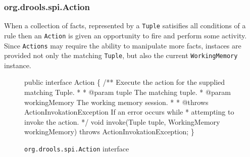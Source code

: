 \subsubsection{org.drools.spi.Action}

When a collection of facts, represented by a \verb|Tuple| satisifies
all conditions of a rule then an \verb|Action| is given an opportunity
to fire and perform some activity.  Since \verb|Actions| may require
the ability to manipulate more facts, instaces are provided not only
the matching \verb|Tuple|, but also the current \verb|WorkingMemory|
instance.

\begin{figure}
\begin{codelisting}
public interface Action
\{
    /** Execute the action for the supplied matching Tuple.
     *
     *  @param tuple The matching tuple.
     *  @param workingMemory The working memory session.
     *
     *  @throws ActionInvokationException If an error occurs while
     *          attempting to invoke the action.
     */
    void invoke(Tuple tuple,
                WorkingMemory workingMemory) throws ActionInvokationException;
\}
\end{codelisting}
\label{code.Action}
\caption{\texttt{org.drools.spi.Action} interface}
\end{figure}

\newpage
